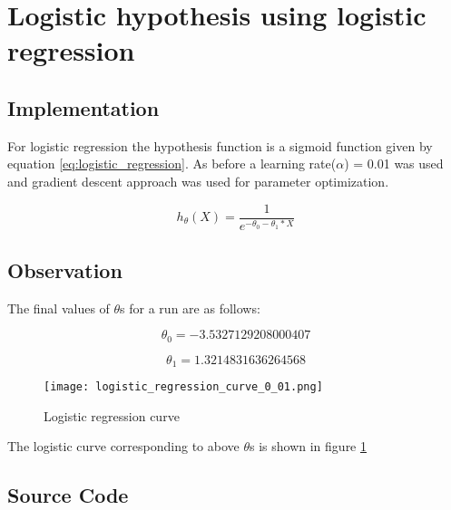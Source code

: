 \section{Logistic hypothesis using logistic regression}

\subsection{Implementation}
For logistic regression the hypothesis function is a sigmoid function given by equation \ref{eq:logistic_regression}.
As before a learning rate($\alpha$) = 0.01 was used and gradient descent approach was used for parameter optimization.

\begin{equation}
\label{eq:logistic_regression}
h_{\theta}(X) = \frac{1}{e^{-\theta_0 - \theta_1 * X}}
\end{equation}

\subsection{Observation}
The final values of $\theta$s for a run are as follows:

\begin{equation}
\theta_0 = -3.5327129208000407
\end{equation}

\begin{equation}
\theta_1 = 1.3214831636264568
\end{equation}

\begin{figure}[!ht]
  \texttt{[image: logistic\_regression\_curve\_0\_01.png]}
  \caption{Logistic regression curve}
  \label{fig:logistic_regression}
\end{figure}

The logistic curve corresponding to above $\theta$s is shown in figure \ref{fig:logistic_regression}

\subsection{Source Code}

